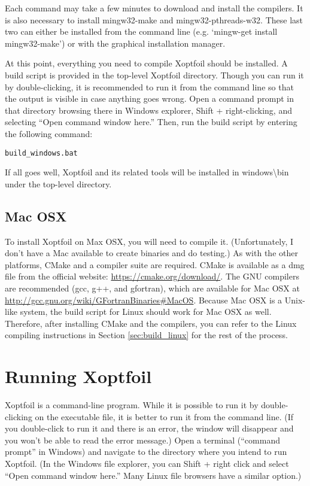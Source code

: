 \documentclass[11pt]{article}
\begin{document}
\noindent Each command may take a few minutes to download and install the compilers. 
It is also necessary to install mingw32-make and mingw32-pthreads-w32. These last two can
either be installed from the command line (e.g. `mingw-get install mingw32-make') or with
the graphical installation manager.

At this point, everything you need to compile Xoptfoil should be installed. A build script
is provided in the top-level Xoptfoil directory. Though you can run it by double-clicking,
it is recommended to run it from the command line so that the output is visible in case
anything goes wrong. Open a command prompt in that directory browsing there in Windows
explorer, Shift + right-clicking, and selecting ``Open command window here.''
Then, run the build script by entering the following command:

\begin{verbatim}
build_windows.bat
\end{verbatim}

If all goes well, Xoptfoil and its related tools will be installed in
windows{\textbackslash}bin under
the top-level directory.

\subsection{Mac OSX}

To install Xoptfoil on Max OSX, you will need to compile it. (Unfortunately, I don't have a
Mac available to create binaries and do testing.) As with the other platforms, CMake and
a compiler suite are required. CMake is available as a dmg file from the official website:
\url{https://cmake.org/download/}. The GNU compilers are recommended (gcc, g++, and
gfortran), which are available for Mac OSX at
\url{http://gcc.gnu.org/wiki/GFortranBinaries#MacOS}. Because Mac OSX is a Unix-like
system, the build script for Linux should work for Mac OSX as well. Therefore, after
installing CMake and the compilers, you can refer to the Linux compiling instructions in
Section \ref{sec:build_linux} for the rest of the process.

\section{Running Xoptfoil}\label{sec:running}

Xoptfoil is a command-line program. While it is possible to run it by double-clicking on
the executable file, it is better to run it from the command line. (If you double-click to
run it and there is an error, the window will disappear and you won't be able to read the
error message.) Open a terminal
(``command prompt'' in Windows) and navigate to the directory where you intend to run
Xoptfoil. (In the Windows file explorer, you can Shift + right click and select ``Open
command window here.'' Many Linux file browsers have a similar option.)
\end{document}
